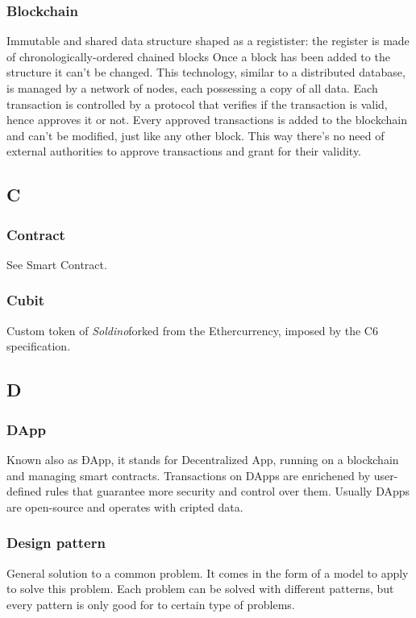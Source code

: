\subsubsection*{Blockchain}
Immutable and shared data structure shaped as a registister: the register is made of chronologically-ordered chained blocks 
Once a block has been added to the structure it can't be changed. 
This technology, similar to a distributed database, is managed by a network of nodes, each possessing a copy of all data. Each transaction is controlled by a protocol that verifies if the transaction is valid, hence approves it or not. Every approved transactions is added to the blockchain and can't be modified, just like any other block. This way there's no need of external authorities to approve transactions and grant for their validity.


\subsection*{C}

\subsubsection*{Contract}
See Smart Contract. 

\subsubsection*{Cubit}
Custom token of \textit{Soldino}\glosp forked from the Ether\glosp currency, imposed by the \glosp C6 specification.


\subsection*{D}

\subsubsection*{DApp}

Known also as ÐApp, it stands for Decentralized App, running on a blockchain and managing smart contracts. Transactions on DApps are enrichened by user-defined rules that guarantee more security and control over them. Usually DApps are open-source and operates with cripted data.

\subsubsection*{Design pattern}
General solution to a common problem. It comes in the form of a model to apply to solve this problem. Each problem can be solved with different patterns, but every pattern is only good for to certain type of problems.


